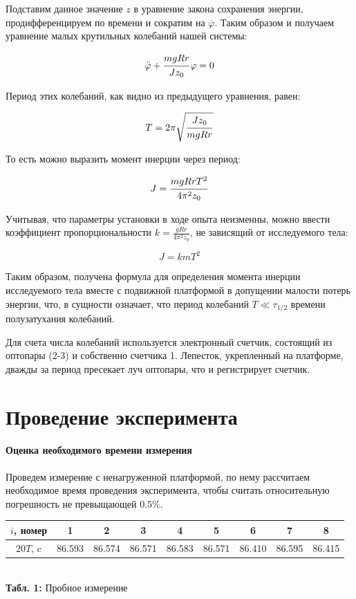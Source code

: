 \documentclass[12pt,a4paper]{scrartcl}
\begin{document}
	Подставим данное значение $z$ в уравнение закона сохранения энергии, продифференцируем по времени и сократим на $\overset{\,.}{\varphi}$. Таким образом и получаем уравнение малых крутильных колебаний нашей системы:
	
	$$\overset{\,..}{\varphi} + \dfrac{\strut mgRr}{\strut Jz_0}\varphi = 0$$
	
	Период этих колебаний, как видно из предыдущего уравнения, равен:
	
	$$T = 2\pi\sqrt{\dfrac{\strut Jz_0}{\strut mgRr}}$$
	
	То есть можно выразить момент инерции через период:
	
	$$J = \dfrac{\strut mgRrT^2}{\strut 4\pi^2z_0}$$
	
	Учитывая, что параметры установки в ходе опыта неизменны, можно ввести коэффициент пропорциональности $k = \frac{gRr}{4\pi^2z_0}$, не зависящий от исследуемого тела:
	
	$$J = kmT^2$$

	Таким образом, получена формула для определения момента инерции исследуемого тела вместе с подвижной платформой в допущении малости потерь энергии, что, в сущности означает, что период колебаний $T \ll \tau_{1/2}$ времени полузатухания колебаний.
	
	Для счета числа колебаний используется электронный счетчик, состоящий из оптопары (2-3) и собственно счетчика 1. Лепесток, укрепленный на платформе, дважды за период пресекает луч оптопары, что и регистрирует счетчик.

	
	\section{Проведение эксперимента}
	
	\paragraph{Оценка необходимого времени измерения} \hfill
	\par Проведем измерение с ненагруженной платформой, по нему рассчитаем необходимое время проведения эксперимента, чтобы считать относительную погрешность не превыщающей $0.5\%$.
	
	\begin{center}
		\begin{tabular}{|c|c|c|c|c|c|c|c|c|}
			\hline
			$i$, номер & 1      & 2      & 3      & 4      & 5      & 6      & 7      & 8
			\\\hline
			$20T$, c   & 86.593 & 86.574 & 86.571 & 86.583 & 86.571 & 86.410 & 86.595 & 86.415
			\\\hline
		\end{tabular}
		\\\textbf{Табл. 1: } Пробное измерение
	\end{center}
\end{document}
